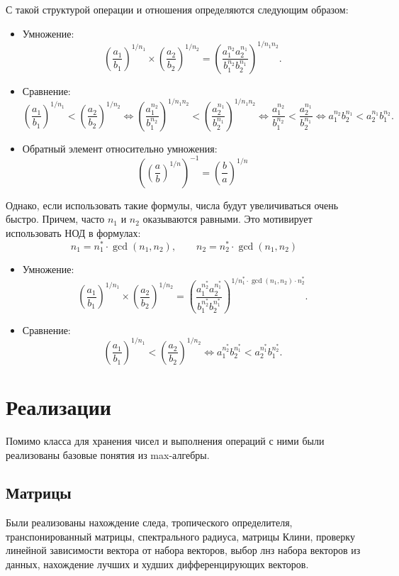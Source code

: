 \documentclass[specialist, substylefile = spbureport.rtx,
    subf,href,colorlinks=true, 12pt]{disser}
\begin{document}
    С такой структурой операции и отношения определяются следующим образом:
    \begin{itemize}
        \item Умножение:
        $$ \left(\frac{a_1}{b_1}\right)^{1/n_1} \times \left(\frac{a_2}{b_2}\right)^{1/n_2} = \left(\frac{a_1^{n_2}a_2^{n_1}}{b_1^{n_2}b_2^{n_1}}\right)^{1/n_1n_2}.$$
        \item Сравнение:
        $$ \left(\frac{a_1}{b_1}\right)^{1/n_1} < \left(\frac{a_2}{b_2}\right)^{1/n_2} \Leftrightarrow
        \left(\frac{a_1^{n_2}}{b_1^{n_2}}\right)^{1/n_1n_2} < \left(\frac{a_2^{n_1}}{b_2^{n_1}}\right)^{1/n_1n_2}\Leftrightarrow
        \frac{a_1^{n_2}}{b_1^{n_2}} < \frac{a_2^{n_1}}{b_2^{n_1}}\Leftrightarrow
        {a_1^{n_2}}{b_2^{n_1}} < {a_2^{n_1}}{b_1^{n_2}}.$$
        \item Обратный элемент относительно умножения:
        $$ \left(\left(\frac{a}{b}\right)^{1/n}\right)^{-1} = \left(\frac{b}{a}\right)^{1/n} $$
    \end{itemize}
    Однако, если использовать такие формулы, числа будут увеличиваться очень быстро.
    Причем, часто $n_1$ и $n_2$ оказываются равными. Это мотивирует использовать НОД в формулах:
    $$n_1 =  n^*_1 \cdot \gcd(n_1, n_2), \qquad n_2 =  n^*_2 \cdot \gcd(n_1, n_2)$$

    \begin{itemize}
        \item Умножение:
        $$ \left(\frac{a_1}{b_1}\right)^{1/n_1} \times \left(\frac{a_2}{b_2}\right)^{1/n_2} = \left(\frac{a_1^{n^*_2}a_2^{n^*_1}}{b_1^{n^*_2}b_2^{n^*_1}}\right)^{1/n^*_1\cdot \gcd(n_1, n_2) \cdot n^*_2}.$$
        \item Сравнение:
        $$ \left(\frac{a_1}{b_1}\right)^{1/n_1} < \left(\frac{a_2}{b_2}\right)^{1/n_2} \Leftrightarrow
        {a_1^{n^*_2}}{b_2^{n^*_1}} < {a_2^{n^*_1}}{b_1^{n^*_2}}.$$
    \end{itemize}


    \chapter{Реализации}

    Помимо класса для хранения чисел и  выполнения операций с ними были реализованы базовые понятия из max-алгебры.

    \section{Матрицы}
    Были реализованы нахождение следа, тропического определителя, транспонированный матрицы, спектрального радиуса, матрицы Клини, проверку линейной зависимости вектора от набора векторов, выбор лнз набора векторов из данных, нахождение лучших и худших дифференцирующих векторов.
\end{document}
